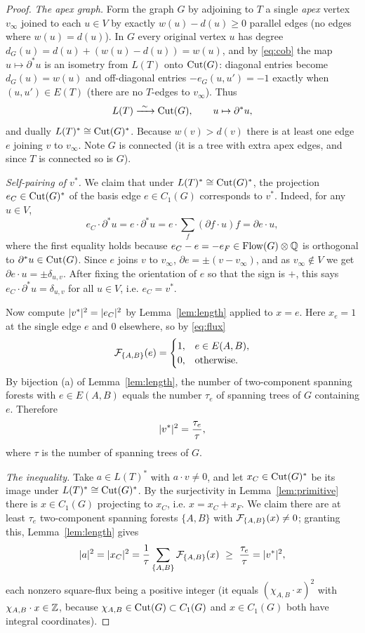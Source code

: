 \begin{proof}
\emph{The apex graph.}  Form the graph $G$ by adjoining to $T$ a single \emph{apex} vertex
$v_\infty$ joined to each $u\in V$ by exactly $w(u)-d(u)\ge0$ parallel edges (no edges where
$w(u)=d(u)$).  In $G$ every original vertex $u$ has degree
$d_G(u)=d(u)+(w(u)-d(u))=w(u)$, and by \eqref{eq:cob} the map $u\mapsto\partial^\ast u$ is an
isometry from $L(T)$ onto $\operatorname{Cut}(G)$: diagonal entries become $d_G(u)=w(u)$ and off-diagonal
entries $-e_G(u,u')=-1$ exactly when $(u,u')\in E(T)$ (there are no $T$-edges to $v_\infty$).
Thus
\[
L(T)\xrightarrow{\ \sim\ }\Cut(G),\qquad u\mapsto\partial^\ast u,
\]
and dually $L(T)^\ast\cong\operatorname{Cut}(G)^\ast$.  Because $w(v)>d(v)$ there is at least one edge $e$
joining $v$ to $v_\infty$.  Note $G$ is connected (it is a tree with extra apex edges, and
since $T$ is connected so is $G$).

\emph{Self-pairing of $v^\ast$.}  We claim that under
$L(T)^\ast\cong\operatorname{Cut}(G)^\ast$, the projection $e_C\in\operatorname{Cut}(G)^\ast$ of the basis edge
$e\in C_1(G)$ corresponds to $v^\ast$.  Indeed, for any $u\in V$,
\[
e_C\cdot\partial^\ast u=e\cdot\partial^\ast u
=e\cdot\sum_{f}(\partial f\cdot u)f=\partial e\cdot u,
\]
where the first equality holds because $e_C-e=-e_F\in\operatorname{Flow}(G)\otimes\mathbb{Q}$ is orthogonal to
$\partial^\ast u\in\operatorname{Cut}(G)$.  Since $e$ joins $v$ to $v_\infty$, $\partial e=\pm(v-v_\infty)$,
and as $v_\infty\notin V$ we get $\partial e\cdot u=\pm\delta_{u,v}$.  After fixing the
orientation of $e$ so that the sign is $+$, this says $e_C\cdot\partial^\ast u=\delta_{u,v}$
for all $u\in V$, i.e. $e_C=v^\ast$.

Now compute $\lvert v^\ast\rvert^{2}=\lvert e_C\rvert^{2}$ by Lemma~\ref{lem:length} applied to $x=e$.  Here
$x_e=1$ at the single edge $e$ and $0$ elsewhere, so by \eqref{eq:flux}
\[
\mathcal{F}_{\{A,B\}}(e)=
\begin{cases}1,& e\in E(A,B),\\0,&\text{otherwise.}\end{cases}
\]
By bijection (a) of Lemma~\ref{lem:length}, the number of two-component spanning forests with
$e\in E(A,B)$ equals the number $\tau_e$ of spanning trees of $G$ containing $e$.  Therefore
\begin{equation}
\label{eq:vstar}
\lvert v^\ast\rvert^{2}=\frac{\tau_e}{\tau},
\end{equation}
where $\tau$ is the number of spanning trees of $G$.

\emph{The inequality.}  Take $a\in L(T)^\ast$ with $a\cdot v\ne0$, and let
$x_C\in\operatorname{Cut}(G)^\ast$ be its image under $L(T)^\ast\cong\operatorname{Cut}(G)^\ast$.  By the surjectivity in
Lemma~\ref{lem:primitive} there is $x\in C_1(G)$ projecting to $x_C$, i.e.
$x=x_C+x_F$.  We claim there are at least $\tau_e$ two-component spanning forests $\{A,B\}$
with $\mathcal{F}_{\{A,B\}}(x)\ne0$; granting this, Lemma~\ref{lem:length} gives
\[
\lvert a\rvert^{2}=\lvert x_C\rvert^{2}=\frac1\tau\sum_{\{A,B\}}\mathcal{F}_{\{A,B\}}(x)
\ \ge\ \frac{\tau_e}{\tau}=\lvert v^\ast\rvert^{2},
\]
each nonzero square-flux being a positive integer (it equals $(\chi_{A,B}\cdot x)^2$ with
$\chi_{A,B}\cdot x\in\mathbb{Z}$, because $\chi_{A,B}\in\operatorname{Cut}(G)\subset C_1(G)$ and $x\in C_1(G)$
both have integral coordinates).


\end{proof}
